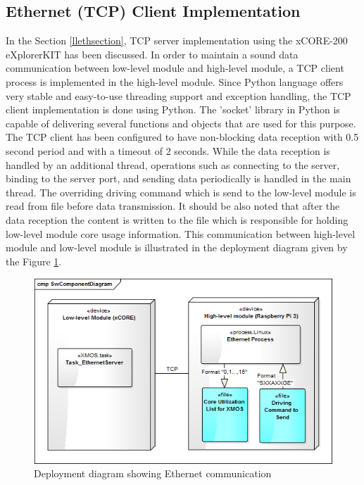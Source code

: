 \subsection{Ethernet (TCP) Client Implementation}
In the Section \ref{llethsection}, TCP server implementation using the xCORE-200 eXplorerKIT has been discussed. In order to maintain a sound data communication between low-level module and high-level module, a TCP client process is implemented in the high-level module. Since Python language offers very stable and easy-to-use threading support and exception handling, the TCP client implementation is done using Python. The 'socket' library \cite{socketpython} in Python is capable of delivering several functions and objects that are used for this purpose. The TCP client has been configured to have non-blocking data reception with 0.5 second period and with a timeout of 2 seconds. While the data reception is handled by an additional thread, operations such as connecting to the server, binding to the server port, and sending data periodically is handled in the main thread. The overriding driving command which is send to the low-level module is read from file before data transmission. It should be also noted that after the data reception the content is written to the file which is responsible for holding low-level module core usage information. This communication between high-level module and low-level module is illustrated in the deployment diagram given by the Figure \ref{fig:ethernetdeployment}.

\begin{figure}[!ht]
	\centering
	\captionsetup{justification=centering}
	\includegraphics[scale=0.7]{content/images/ethernetdeployment.png}
	\caption{Deployment diagram showing Ethernet communication}
	\label{fig:ethernetdeployment}
\end{figure}

